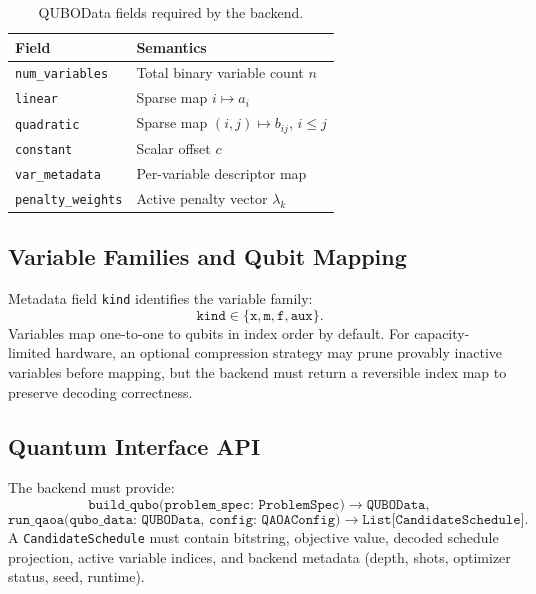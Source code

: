 \documentclass{article}
\begin{document}
\begin{table}[t]
\centering
\caption{QUBOData fields required by the backend.}
\begin{tabular}{ll}
\toprule
Field & Semantics \\
\midrule
\texttt{num\_variables} & Total binary variable count $n$ \\
\texttt{linear} & Sparse map $i\mapsto a_i$ \\
\texttt{quadratic} & Sparse map $(i,j)\mapsto b_{ij}$, $i\le j$ \\
\texttt{constant} & Scalar offset $c$ \\
\texttt{var\_metadata} & Per-variable descriptor map \\
\texttt{penalty\_weights} & Active penalty vector $\lambda_k$ \\
\bottomrule
\end{tabular}
\end{table}

\subsection{Variable Families and Qubit Mapping}
Metadata field \texttt{kind} identifies the variable family:
\begin{equation}
\texttt{kind} \in \{\texttt{x},\texttt{m},\texttt{f},\texttt{aux}\}.
\end{equation}
Variables map one-to-one to qubits in index order by default. For capacity-limited hardware, an optional compression strategy may prune provably inactive variables before mapping, but the backend must return a reversible index map to preserve decoding correctness.

\subsection{Quantum Interface API}
The backend must provide:
\begin{equation}
\texttt{build\_qubo(problem\_spec: ProblemSpec)} \rightarrow \texttt{QUBOData},
\end{equation}
\begin{equation}
\texttt{run\_qaoa(qubo\_data: QUBOData, config: QAOAConfig)} \rightarrow \texttt{List[CandidateSchedule]}.
\end{equation}
A \texttt{CandidateSchedule} must contain bitstring, objective value, decoded schedule projection, active variable indices, and backend metadata (depth, shots, optimizer status, seed, runtime).
\end{document}
